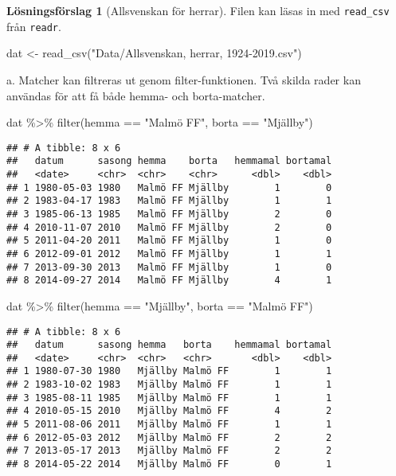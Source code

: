 \documentclass[
]{book}
\newenvironment{Shaded}{\begin{snugshade}}{\end{snugshade}}
\newcommand{\FunctionTok}[1]{\textcolor[rgb]{0.00,0.00,0.00}{#1}}
\newcommand{\NormalTok}[1]{#1}
\newcommand{\OtherTok}[1]{\textcolor[rgb]{0.56,0.35,0.01}{#1}}
\newcommand{\SpecialCharTok}[1]{\textcolor[rgb]{0.00,0.00,0.00}{#1}}
\newcommand{\StringTok}[1]{\textcolor[rgb]{0.31,0.60,0.02}{#1}}
\theoremstyle{definition}
\theoremstyle{definition}
\theoremstyle{definition}
\theoremstyle{definition}
\newtheorem{hypothesis}{Lösningsförslag}[chapter]
\theoremstyle{remark}
\begin{document}
\begin{hypothesis}[Allsvenskan för herrar]
Filen kan läsas in med \texttt{read\_csv} från \texttt{readr}.

\begin{Shaded}
\begin{Highlighting}[]
\NormalTok{dat }\OtherTok{\textless{}{-}} \FunctionTok{read\_csv}\NormalTok{(}\StringTok{"Data/Allsvenskan, herrar, 1924{-}2019.csv"}\NormalTok{)}
\end{Highlighting}
\end{Shaded}

a. Matcher kan filtreras ut genom filter-funktionen. Två skilda rader kan användas för att få både hemma- och borta-matcher.

\begin{Shaded}
\begin{Highlighting}[]
\NormalTok{dat }\SpecialCharTok{\%\textgreater{}\%} \FunctionTok{filter}\NormalTok{(hemma }\SpecialCharTok{==} \StringTok{"Malmö FF"}\NormalTok{, borta }\SpecialCharTok{==} \StringTok{"Mjällby"}\NormalTok{)}
\end{Highlighting}
\end{Shaded}

\begin{verbatim}
## # A tibble: 8 x 6
##   datum      sasong hemma    borta   hemmamal bortamal
##   <date>     <chr>  <chr>    <chr>      <dbl>    <dbl>
## 1 1980-05-03 1980   Malmö FF Mjällby        1        0
## 2 1983-04-17 1983   Malmö FF Mjällby        1        1
## 3 1985-06-13 1985   Malmö FF Mjällby        2        0
## 4 2010-11-07 2010   Malmö FF Mjällby        2        0
## 5 2011-04-20 2011   Malmö FF Mjällby        1        0
## 6 2012-09-01 2012   Malmö FF Mjällby        1        1
## 7 2013-09-30 2013   Malmö FF Mjällby        1        0
## 8 2014-09-27 2014   Malmö FF Mjällby        4        1
\end{verbatim}

\begin{Shaded}
\begin{Highlighting}[]
\NormalTok{dat }\SpecialCharTok{\%\textgreater{}\%} \FunctionTok{filter}\NormalTok{(hemma }\SpecialCharTok{==} \StringTok{"Mjällby"}\NormalTok{, borta }\SpecialCharTok{==} \StringTok{"Malmö FF"}\NormalTok{)}
\end{Highlighting}
\end{Shaded}

\begin{verbatim}
## # A tibble: 8 x 6
##   datum      sasong hemma   borta    hemmamal bortamal
##   <date>     <chr>  <chr>   <chr>       <dbl>    <dbl>
## 1 1980-07-30 1980   Mjällby Malmö FF        1        1
## 2 1983-10-02 1983   Mjällby Malmö FF        1        1
## 3 1985-08-11 1985   Mjällby Malmö FF        1        1
## 4 2010-05-15 2010   Mjällby Malmö FF        4        2
## 5 2011-08-06 2011   Mjällby Malmö FF        1        1
## 6 2012-05-03 2012   Mjällby Malmö FF        2        2
## 7 2013-05-17 2013   Mjällby Malmö FF        2        2
## 8 2014-05-22 2014   Mjällby Malmö FF        0        1
\end{verbatim}


\end{hypothesis}
\end{document}
